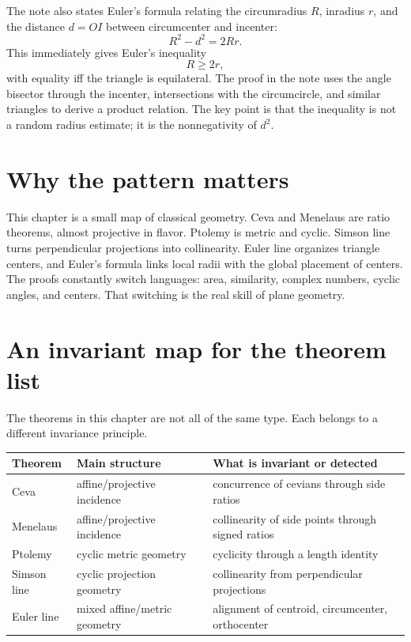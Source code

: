 The note also states Euler's formula relating the circumradius $R$, inradius $r$, and the distance $d=OI$ between circumcenter and incenter:
\[
  R^2-d^2=2Rr.
\]
This immediately gives Euler's inequality
\[
  R\ge 2r,
\]
with equality iff the triangle is equilateral.  The proof in the note uses the angle bisector through the incenter, intersections with the circumcircle, and similar triangles to derive a product relation.  The key point is that the inequality is not a random radius estimate; it is the nonnegativity of $d^2$.

\section{Why the pattern matters}

This chapter is a small map of classical geometry.  Ceva and Menelaus are ratio theorems, almost projective in flavor.  Ptolemy is metric and cyclic.  Simson line turns perpendicular projections into collinearity.  Euler line organizes triangle centers, and Euler's formula links local radii with the global placement of centers.  The proofs constantly switch languages: area, similarity, complex numbers, cyclic angles, and centers.  That switching is the real skill of plane geometry.

\section{An invariant map for the theorem list}

The theorems in this chapter are not all of the same type.  Each belongs to a different invariance principle.

\begin{center}
\small
\begin{tabularx}{\textwidth}{@{}lYY@{}}
\toprule
Theorem & Main structure & What is invariant or detected\\
\midrule
Ceva & affine/projective incidence & concurrence of cevians through side ratios\\
Menelaus & affine/projective incidence & collinearity of side points through signed ratios\\
Ptolemy & cyclic metric geometry & cyclicity through a length identity\\
Simson line & cyclic projection geometry & collinearity from perpendicular projections\\
Euler line & mixed affine/metric geometry & alignment of centroid, circumcenter, orthocenter\\
\bottomrule
\end{tabularx}
\end{center}

